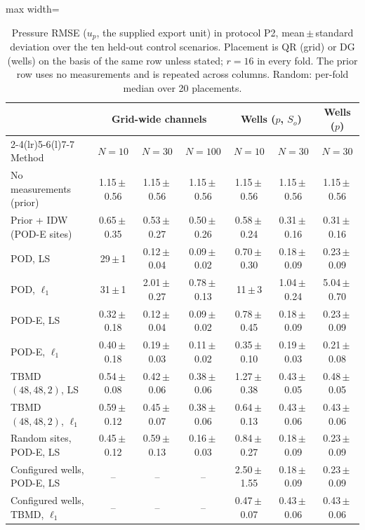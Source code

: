 \begin{table}[tbp]
\centering
\scriptsize
\setlength{\tabcolsep}{2.5pt}
\caption{Pressure RMSE ($u_p$, the supplied export unit) in protocol P2, mean\,$\pm$\,standard deviation over the ten held-out control scenarios. Placement is QR (grid) or DG (wells) on the basis of the same row unless stated; $r=16$ in every fold. The prior row uses no measurements and is repeated across columns. Random: per-fold median over 20 placements.}
\label{tab:main}
\begin{adjustbox}{max width=\linewidth}
\begin{tabular}{@{}lcccccc@{}}
\toprule
 & \multicolumn{3}{c}{Grid-wide channels} & \multicolumn{2}{c}{Wells ($p$, $S_o$)} & Wells ($p$) \\
\cmidrule(lr){2-4}\cmidrule(lr){5-6}\cmidrule(l){7-7}
Method & $N=10$ & $N=30$ & $N=100$ & $N=10$ & $N=30$ & $N=30$ \\
\midrule
No measurements (prior) & 1.15\,$\pm$\,0.56 & 1.15\,$\pm$\,0.56 & 1.15\,$\pm$\,0.56 & 1.15\,$\pm$\,0.56 & 1.15\,$\pm$\,0.56 & 1.15\,$\pm$\,0.56 \\
Prior + IDW (POD-E sites) & 0.65\,$\pm$\,0.35 & 0.53\,$\pm$\,0.27 & 0.50\,$\pm$\,0.26 & 0.58\,$\pm$\,0.24 & 0.31\,$\pm$\,0.16 & 0.31\,$\pm$\,0.16 \\
POD, LS & 29\,$\pm$\,1 & 0.12\,$\pm$\,0.04 & 0.09\,$\pm$\,0.02 & 0.70\,$\pm$\,0.30 & 0.18\,$\pm$\,0.09 & 0.23\,$\pm$\,0.09 \\
POD, $\ell_1$ & 31\,$\pm$\,1 & 2.01\,$\pm$\,0.27 & 0.78\,$\pm$\,0.13 & 11\,$\pm$\,3 & 1.04\,$\pm$\,0.24 & 5.04\,$\pm$\,0.70 \\
POD-E, LS & 0.32\,$\pm$\,0.18 & 0.12\,$\pm$\,0.04 & 0.09\,$\pm$\,0.02 & 0.78\,$\pm$\,0.45 & 0.18\,$\pm$\,0.09 & 0.23\,$\pm$\,0.09 \\
POD-E, $\ell_1$ & 0.40\,$\pm$\,0.18 & 0.19\,$\pm$\,0.03 & 0.11\,$\pm$\,0.02 & 0.35\,$\pm$\,0.10 & 0.19\,$\pm$\,0.03 & 0.21\,$\pm$\,0.08 \\
TBMD $(48,48,2)$, LS & 0.54\,$\pm$\,0.08 & 0.42\,$\pm$\,0.06 & 0.38\,$\pm$\,0.06 & 1.27\,$\pm$\,0.38 & 0.43\,$\pm$\,0.05 & 0.48\,$\pm$\,0.05 \\
TBMD $(48,48,2)$, $\ell_1$ & 0.59\,$\pm$\,0.12 & 0.45\,$\pm$\,0.07 & 0.38\,$\pm$\,0.06 & 0.64\,$\pm$\,0.13 & 0.43\,$\pm$\,0.06 & 0.43\,$\pm$\,0.06 \\
Random sites, POD-E, LS & 0.45\,$\pm$\,0.12 & 0.59\,$\pm$\,0.13 & 0.16\,$\pm$\,0.03 & 0.84\,$\pm$\,0.27 & 0.18\,$\pm$\,0.09 & 0.23\,$\pm$\,0.09 \\
Configured wells, POD-E, LS & -- & -- & -- & 2.50\,$\pm$\,1.55 & 0.18\,$\pm$\,0.09 & 0.23\,$\pm$\,0.09 \\
Configured wells, TBMD, $\ell_1$ & -- & -- & -- & 0.47\,$\pm$\,0.07 & 0.43\,$\pm$\,0.06 & 0.43\,$\pm$\,0.06 \\
\bottomrule
\end{tabular}
\end{adjustbox}
\end{table}
